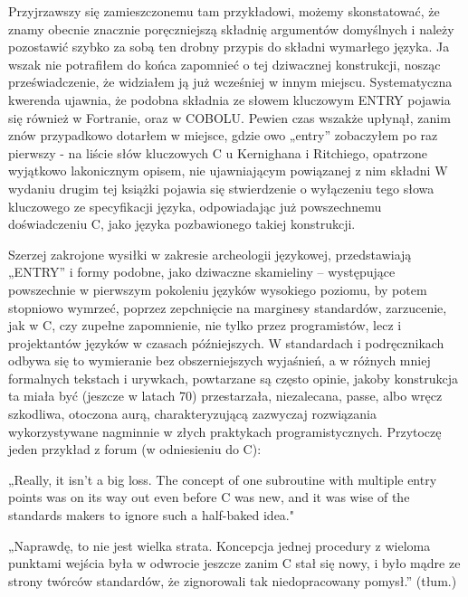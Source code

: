 Przyjrzawszy się zamieszczonemu tam przykładowi, możemy skonstatować, że znamy obecnie znacznie poręczniejszą składnię argumentów domyślnych i należy pozostawić szybko za sobą ten drobny przypis do składni wymarłego języka. Ja wszak nie potrafiłem do końca zapomnieć o tej dziwacznej konstrukcji, nosząc przeświadczenie, że widziałem ją już wcześniej w innym miejscu. Systematyczna kwerenda ujawnia, że podobna składnia ze słowem kluczowym ENTRY pojawia się również w Fortranie\cite[str.~120]{bielecki}, oraz w COBOLU\cite{ibm_manual_on_ENTRY_in_COBOL}. Pewien czas wszakże upłynął, zanim znów przypadkowo dotarłem w miejsce, gdzie owo „entry” zobaczyłem po raz pierwszy -  na liście słów kluczowych C u Kernighana i Ritchiego, opatrzone wyjątkowo lakonicznym opisem, nie ujawniającym powiązanej z nim składni\cite[str.~120]{KiR}
W wydaniu drugim tej książki pojawia się stwierdzenie o wyłączeniu tego słowa kluczowego ze specyfikacji języka\cite[rozdz.~A2.4,~str.192]{KiR2}, odpowiadając już powszechnemu doświadczeniu C, jako języka pozbawionego takiej konstrukcji.

Szerzej zakrojone wysiłki w zakresie archeologii językowej, przedstawiają „ENTRY” i formy podobne, jako dziwaczne skamieliny – występujące powszechnie w pierwszym pokoleniu języków wysokiego poziomu, by potem stopniowo wymrzeć, poprzez zepchnięcie na marginesy standardów, zarzucenie, jak w C, czy zupełne zapomnienie, nie tylko przez programistów, lecz i projektantów języków w czasach późniejszych. W standardach i podręcznikach odbywa się to wymieranie bez obszerniejszych wyjaśnień, a w różnych mniej formalnych tekstach i urywkach, powtarzane są często opinie, jakoby konstrukcja ta miała być (jeszcze w latach 70) przestarzała, niezalecana,  passe, albo wręcz szkodliwa, otoczona aurą, charakteryzującą zazwyczaj rozwiązania wykorzystywane nagminnie w złych praktykach programistycznych. Przytoczę jeden przykład z forum (w odniesieniu do C):

„Really, it isn't a big loss. The concept of one subroutine with multiple entry points was on its way out even before C was new, and it was wise of the standards makers to ignore such a half-baked idea."\cite{delreth_on_entry}

„Naprawdę, to nie jest wielka strata. Koncepcja jednej procedury z wieloma punktami wejścia była w odwrocie jeszcze zanim C stał się nowy, i było mądre ze strony twórców standardów, że zignorowali tak niedopracowany pomysł.” (tłum.)
 
